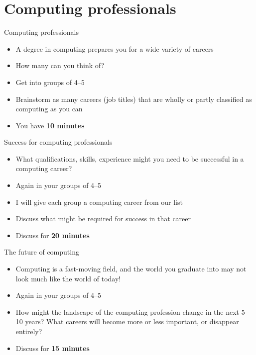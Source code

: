 \part{Computing professionals}
\frame{\partpage}

\begin{frame}{Computing professionals}
	\begin{itemize}
		\pause\item A degree in computing prepares you for a wide variety of careers
		\pause\item How many can you think of?
		\pause\item Get into groups of 4--5
		\pause\item Brainstorm as many careers (job titles) that are wholly or partly classified as computing
			as you can
		\pause\item You have \textbf{10 minutes}
	\end{itemize}
\end{frame}

\begin{frame}{Success for computing professionals}
	\begin{itemize}
		\pause\item What qualifications, skills, experience might you need to be successful in a computing career?
		\pause\item Again in your groups of 4--5
		\pause\item I will give each group a computing career from our list
		\pause\item Discuss what might be required for success in that career
		\pause\item Discuss for \textbf{20 minutes}
	\end{itemize}
\end{frame}

\begin{frame}{The future of computing}
	\begin{itemize}
		\pause\item Computing is a fast-moving field, and the world you graduate into may not look much like the world of today!
		\pause\item Again in your groups of 4--5
		\pause\item How might the landscape of the computing profession change in the next 5--10 years?
			What careers will become more or less important, or disappear entirely?
		\pause\item Discuss for \textbf{15 minutes}
	\end{itemize}
\end{frame}
